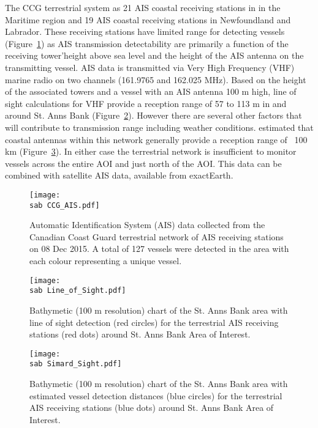 \documentclass[letterpaper,portrait,11pt]{scrartcl}
\numberwithin{equation}{section}		%
\numberwithin{figure}{section}		%
\numberwithin{table}{section}				%
\newcommand{\ecomod}{\string~/ecomod_data/}   %
\newcommand{\sab}{\ecomod/mpa/sab/}   %
\begin{document}
The CCG terrestrial system as 21 AIS coastal receiving stations in in the Maritime region and 19 AIS coastal receiving stations in Newfoundland and Labrador.  These receiving stations have limited range for detecting vessels (Figure~\ref{fig:TAIS}) as AIS transmission detectability are primarily a function of the receiving tower\textquoteright height above sea level and the height of the AIS antenna on the transmitting vessel.  AIS data is transmitted via Very High Frequency (VHF) marine radio on two channels (161.9765 and 162.025 MHz).  Based on the height of the associated towers and a vessel with an AIS antenna 100 m high, line of sight calculations for VHF provide a reception range of  57 to 113 m in and around St. Anns Bank (Figure~\ref{fig:LOF}).  However there are several other factors that will contribute to transmission range including weather conditions. \textcite{Simard2014shipping} estimated that coastal antennas within this network generally provide a reception range of ~100 km (Figure~\ref{fig:DetAIS}).  In either case the terrestrial network is insufficient to monitor vessels across the entire AOI and just north of the AOI. This data can be combined with satellite AIS data, available from exactEarth.


\begin{figure}[h]
  \centering
	\texttt{[image: \\sab CCG\_AIS.pdf]}
	\caption{Automatic Identification System (AIS) data collected from the Canadian Coast Guard terrestrial network of AIS receiving stations on 08 Dec 2015. A total of 127 vessels were detected in the area with each colour representing a unique vessel.}
    \label{fig:TAIS}
\end{figure}


\begin{figure}[h]
	\centering
	\texttt{[image: \\sab Line\_of\_Sight.pdf]}
	\caption{Bathymetic (100 m resolution) chart of the  St. Anns Bank area with line of sight detection (red circles) for the terrestrial AIS receiving stations (red dots) around St. Anns Bank Area of Interest.}
   \label{fig:LOF}
\end{figure}

\begin{figure}[h]
	\centering
	\texttt{[image: \\sab Simard\_Sight.pdf]}
	\caption{Bathymetic (100 m resolution) chart of the  St. Anns Bank area with  \textcite{Simard2014shipping} estimated vessel detection distances (blue circles) for the terrestrial AIS receiving stations (blue dots) around St. Anns Bank Area of Interest.}
  \label{fig:DetAIS}
\end{figure}
\end{document}
